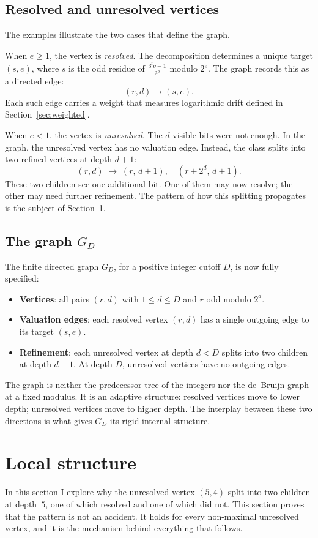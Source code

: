 \documentclass[11pt]{amsart}
\theoremstyle{definition}
\theoremstyle{remark}
\begin{document}
\subsection{Resolved and unresolved vertices}

The examples illustrate the two cases that define the graph.

When $e\ge1$, the vertex is \emph{resolved}.  The decomposition determines a unique target $(s,e)$, where $s$ is the odd residue of $\frac{3^tq-1}{2^\rho}$ modulo $2^e$.  The graph records this as a directed edge:
\[
(r,d)\to(s,e).
\]
Each such edge carries a weight that measures logarithmic drift defined in Section~\ref{sec:weighted}.

When $e<1$, the vertex is \emph{unresolved}.  The $d$ visible bits were not enough.  In the graph, the unresolved vertex has no valuation edge.  Instead, the class splits into two refined vertices at depth $d+1$:
\[
(r,d)\;\longmapsto\;(r,\,d+1),\quad (r+2^d,\,d+1).
\]
These two children see one additional bit.  One of them may now resolve; the other may need further refinement.  The pattern of how this splitting propagates is the subject of Section~\ref{sec:local}.

\subsection{The graph $G_D$}

The finite directed graph $G_D$, for a positive integer cutoff $D$, is now fully specified:
\begin{itemize}
\item \textbf{Vertices}: all pairs $(r,d)$ with $1\le d\le D$ and $r$ odd modulo $2^d$.
\item \textbf{Valuation edges}: each resolved vertex $(r,d)$ has a single outgoing edge to its target $(s,e)$.
\item \textbf{Refinement}: each unresolved vertex at depth $d<D$ splits into two children at depth $d+1$.  At depth $D$, unresolved vertices have no outgoing edges.
\end{itemize}

The graph is neither the predecessor tree of the integers nor the de~Bruijn graph at a fixed modulus.  It is an adaptive structure: resolved vertices move to lower depth; unresolved vertices move to higher depth.  The interplay between these two directions is what gives $G_D$ its rigid internal structure.

\section{Local structure}\label{sec:local}
In this section I explore why the unresolved vertex $(5,4)$ split into two children at depth~$5$, one of which resolved and one of which did not. This section proves that the pattern is not an accident.  It holds for every non-maximal unresolved vertex, and it is the mechanism behind everything that follows.
\end{document}
